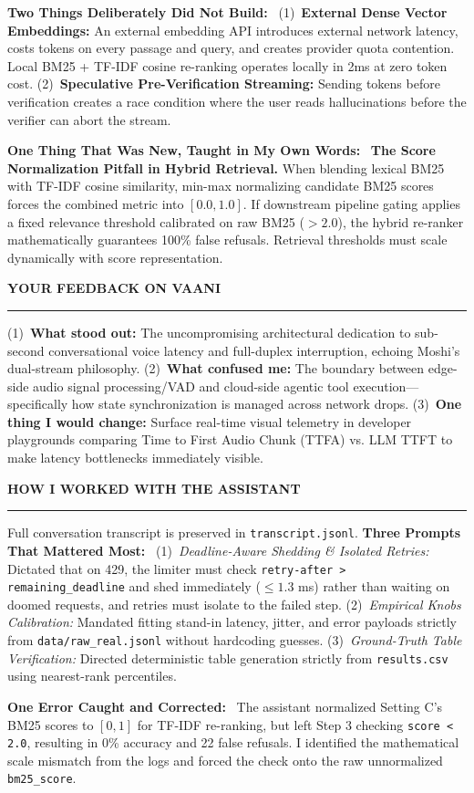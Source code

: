 \documentclass[10pt,a4paper]{article}
\newcommand{\secheader}[1]{\vspace{0.2em}\noindent\textbf{\small\MakeUppercase{#1}}\vspace{0.05em}\par\hrule\vspace{0.12em}}
\newcommand{\subhead}[1]{\noindent\textbf{#1}\ }
\begin{document}
\subhead{Two Things Deliberately Did Not Build:}
(1)~\textbf{External Dense Vector Embeddings:} An external embedding API introduces external network latency, costs tokens on every passage and query, and creates provider quota contention. Local BM25 + TF-IDF cosine re-ranking operates locally in 2ms at zero token cost.
(2)~\textbf{Speculative Pre-Verification Streaming:} Sending tokens before verification creates a race condition where the user reads hallucinations before the verifier can abort the stream.

\subhead{One Thing That Was New, Taught in My Own Words:}
\textbf{The Score Normalization Pitfall in Hybrid Retrieval.} When blending lexical BM25 with TF-IDF cosine similarity, min-max normalizing candidate BM25 scores forces the combined metric into $[0.0, 1.0]$. If downstream pipeline gating applies a fixed relevance threshold calibrated on raw BM25 ($>2.0$), the hybrid re-ranker mathematically guarantees 100\% false refusals. Retrieval thresholds must scale dynamically with score representation.

\secheader{Your Feedback on Vaani}
(1)~\textbf{What stood out:} The uncompromising architectural dedication to sub-second conversational voice latency and full-duplex interruption, echoing Moshi's dual-stream philosophy.
(2)~\textbf{What confused me:} The boundary between edge-side audio signal processing/VAD and cloud-side agentic tool execution—specifically how state synchronization is managed across network drops.
(3)~\textbf{One thing I would change:} Surface real-time visual telemetry in developer playgrounds comparing Time to First Audio Chunk (TTFA) vs. LLM TTFT to make latency bottlenecks immediately visible.

\secheader{How I Worked With the Assistant}
Full conversation transcript is preserved in \texttt{transcript.jsonl}.
\subhead{Three Prompts That Mattered Most:}
(1)~\textit{Deadline-Aware Shedding \& Isolated Retries:} Dictated that on 429, the limiter must check \texttt{retry-after > remaining\_deadline} and shed immediately ($\le 1.3$ ms) rather than waiting on doomed requests, and retries must isolate to the failed step.
(2)~\textit{Empirical Knobs Calibration:} Mandated fitting stand-in latency, jitter, and error payloads strictly from \texttt{data/raw\_real.jsonl} without hardcoding guesses.
(3)~\textit{Ground-Truth Table Verification:} Directed deterministic table generation strictly from \texttt{results.csv} using nearest-rank percentiles.

\subhead{One Error Caught and Corrected:}
The assistant normalized Setting C's BM25 scores to $[0, 1]$ for TF-IDF re-ranking, but left Step 3 checking \texttt{score < 2.0}, resulting in 0\% accuracy and 22 false refusals. I identified the mathematical scale mismatch from the logs and forced the check onto the raw unnormalized \texttt{bm25\_score}.
\end{document}
